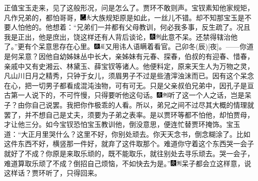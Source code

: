 正值宝玉走来，见了这般形况，问是怎么了。贾环不敢则声。宝钗素知他家规矩，凡作兄弟的，都怕哥哥，{\includegraphics[width=3mm]{../Images/00003}\includegraphics[width=3mm]{../Images/00012}\footnotesize \kaishu 大族规矩原是如此，一丝儿不错。}却不知那宝玉是不要人怕他的。他想着：“兄弟们一并都有父母教训，何必我多事，反生疏了。况且我是正出，他是庶出，饶这样还有人背后谈论，{\includegraphics[width=3mm]{../Images/00004}\includegraphics[width=3mm]{../Images/00011}\footnotesize \kaishu 此意不呆。}还禁得辖治他了。”更有个呆意思存在心里。{{\includegraphics[width=3mm]{../Images/00004}\includegraphics[width=3mm]{../Images/00010}\footnotesize \kaishu 又用讳人语瞒着看官。己卯冬{(辰)}{[}夜{]}。}}------你道是何呆意？因他自幼姊妹丛中长大，亲姊妹有元春、探春，伯叔的有迎春、惜春，亲戚中又有史湘云、林黛玉、薛宝钗等诸人。他便料定，原来天生人为万物之灵，凡山川日月之精秀，只钟于女儿，须眉男子不过是些渣滓浊沫而已。因有这个呆念在心，把一切男子都看成混沌浊物，可有可无。只是父亲叔伯兄弟中，因孔子是亘古第一人说下的，不可忤慢，只得要听他这句话。{\includegraphics[width=3mm]{../Images/00004}\includegraphics[width=3mm]{../Images/00011}\footnotesize \kaishu 听了这一个人之话，岂是呆子？由你自己说罢。我把你作极乖的人看。}所以，弟兄之间不过尽其大概的情理就罢了，并不想自己是丈夫，须要为子弟之表率。是以贾环等都不怕他，却怕贾母，才让他三分。如今宝钗恐怕宝玉教训他，倒没意思，便连忙替贾环掩饰。宝玉道：“大正月里哭什么？这里不好，你别处顽去。你天天念书，倒念糊涂了。比如这件东西不好，横竖那一件好，就弃了这件取那个。难道你守着这个东西哭一会子就好了不成？你原是来取乐顽的，既不能取乐，就往别处去寻乐顽去。哭一会子，难道算取乐顽了不成？倒招自己烦恼，不如快去为是。”{\includegraphics[width=3mm]{../Images/00004}\includegraphics[width=3mm]{../Images/00011}\footnotesize \kaishu 呆子都会立这样意，说这样话？}贾环听了，只得回来。

